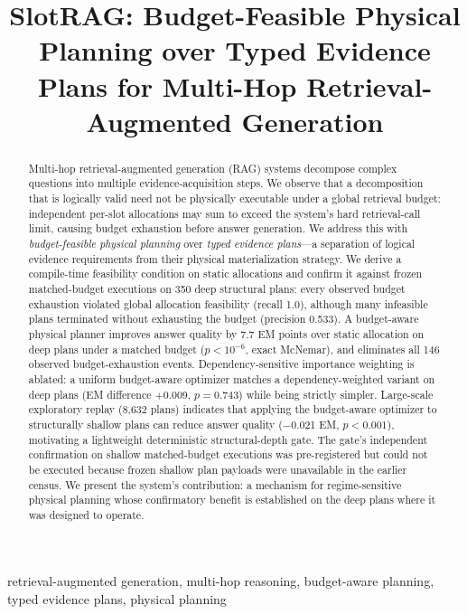 \documentclass[journal]{IEEEtran}
\title{SlotRAG: Budget-Feasible Physical Planning over Typed Evidence Plans for Multi-Hop Retrieval-Augmented Generation}
\author{%
\IEEEauthorblockN{Anonymous Author\IEEEauthorrefmark{1}%
\thanks{Manuscript received...; revised...; accepted...; published...}%
\thanks{Manuscript ID: TKDE-2026-XXXX}}
\IEEEauthorblockA{\IEEEauthorrefmark{1}Anonymous Institution\\
Email: anonymous@anonymous.edu}
}
\begin{document}
\begin{abstract}
Multi-hop retrieval-augmented generation (RAG) systems decompose complex
questions into multiple evidence-acquisition steps. We observe that a
decomposition that is logically valid need not be physically executable under
a global retrieval budget: independent per-slot allocations may sum to
exceed the system's hard retrieval-call limit, causing budget exhaustion
before answer generation. We address this with \emph{budget-feasible
physical planning} over \emph{typed evidence plans}---a separation
of logical evidence requirements from their physical materialization
strategy. We derive a compile-time feasibility condition on static
allocations and confirm it against frozen matched-budget executions
on 350 deep structural plans: every observed budget exhaustion violated
global allocation feasibility (recall 1.0), although many infeasible plans
terminated without exhausting the budget (precision 0.533). A
budget-aware physical planner improves answer quality by 7.7 EM points
over static allocation on deep plans under a matched budget
($p < 10^{-6}$, exact McNemar), and eliminates all 146 observed
budget-exhaustion events. Dependency-sensitive importance weighting
is ablated: a uniform budget-aware optimizer matches a dependency-weighted
variant on deep plans (EM difference $+$0.009, $p = 0.743$) while
being strictly simpler. Large-scale exploratory replay (8{,}632 plans)
indicates that applying the budget-aware optimizer to structurally shallow
plans can reduce answer quality ($-$0.021 EM, $p < 0.001$), motivating
a lightweight deterministic structural-depth gate. The gate's independent
confirmation on shallow matched-budget executions was pre-registered but
could not be executed because frozen shallow plan payloads were unavailable
in the earlier census. We present the system's contribution:
a mechanism for regime-sensitive physical planning whose confirmatory
benefit is established on the deep plans where it was designed to operate.
\end{abstract}

\begin{IEEEkeywords}
retrieval-augmented generation, multi-hop reasoning, budget-aware planning,
typed evidence plans, physical planning
\end{IEEEkeywords}

\maketitle
\end{document}
